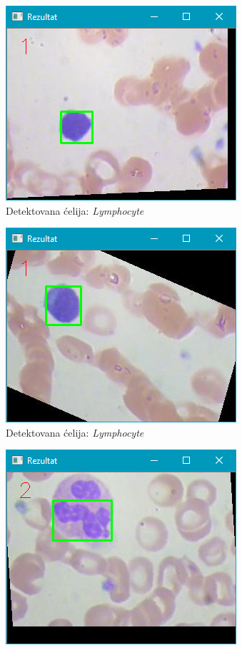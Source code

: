 \documentclass[12pt,a4paper]{article}
\begin{document}
\begin{figure}[H]
\begin{subfigure}{.5\textwidth}
  \centering
  \includegraphics[scale=.9]{slikaMain1.png}
  \caption{Detektovana ćelija: \textit{Lymphocyte}}
\end{subfigure}
\begin{subfigure}{.5\textwidth}
  \centering
  \includegraphics[scale=.9]{slikaMain2.png}
  \caption{Detektovana ćelija: \textit{Lymphocyte}}
\end{subfigure}
\begin{subfigure}{.5\textwidth}
  \centering
  \includegraphics[scale=.9]{slikaMain3.png}

\end{subfigure}
\end{figure}
\end{document}
